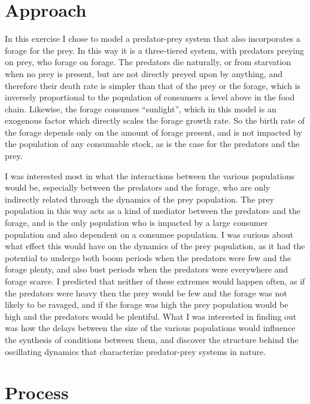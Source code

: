 \documentclass[12pt]{article}
\begin{document}
\maketitle

\section{Approach}

In this exercise I chose to model a predator-prey system that also incorporates a forage for the prey.  In this way it is a three-tiered system, with predators preying on prey, who forage on forage.  The predators die naturally, or from starvation when no prey is present, but are not directly preyed upon by anything, and therefore their death rate is simpler than that of the prey or the forage, which is inversely proportional to the population of consumers a level above in the food chain.  Likewise, the forage consumes ``sunlight'', which in this model is an exogenous factor which directly scales the forage growth rate.  So the birth rate of the forage depends only on the amount of forage present, and is not impacted by the population of any consumable stock, as is the case for the predators and the prey.  

I was interested most in what the interactions between the various populations would be, especially between the predators and the forage, who are only indirectly related through the dynamics of the prey population.  The prey population in this way acts as a kind of mediator between the predators and the forage, and is the only population who is impacted by a large consumer population and also dependent on a consumee population.  I was curious about what effect this would have on the dynamics of the prey population, as it had the potential to undergo both boom periods when the predators were few and the forage plenty, and also bust periods when the predators were everywhere and forage scarce.  I predicted that neither of these extremes would happen often, as if the predators were heavy then the prey would be few and the forage was not likely to be ravaged, and if the forage was high the prey population would be high and the predators would be plentiful.  What I was interested in finding out was how the delays between the size of the various populations would influence the synthesis of conditions between them, and discover the structure behind the oscillating dynamics that characterize predator-prey systems in nature.  

\section{Process}
\end{document}
